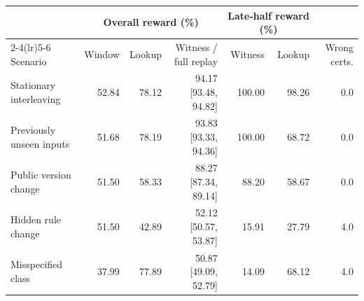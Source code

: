 \begin{tabular}{lrrrrrr}
\toprule
& \multicolumn{3}{c}{Overall reward (\%)} & \multicolumn{2}{c}{Late-half reward (\%)} & \\
\cmidrule(lr){2-4}\cmidrule(lr){5-6}
Scenario & Window & Lookup & Witness / full replay & Witness & Lookup & Wrong certs. \\
\midrule
Stationary interleaving & 52.84 & 78.12 & 94.17 [93.48, 94.82] & 100.00 & 98.26 & 0.0 \\
Previously unseen inputs & 51.68 & 78.19 & 93.83 [93.33, 94.36] & 100.00 & 68.72 & 0.0 \\
Public version change & 51.50 & 58.33 & 88.27 [87.34, 89.14] & 88.20 & 58.67 & 0.0 \\
Hidden rule change & 51.50 & 42.89 & 52.12 [50.57, 53.87] & 15.91 & 27.79 & 4.0 \\
Misspecified class & 37.99 & 77.89 & 50.87 [49.09, 52.79] & 14.09 & 68.12 & 4.0 \\
\bottomrule
\end{tabular}
